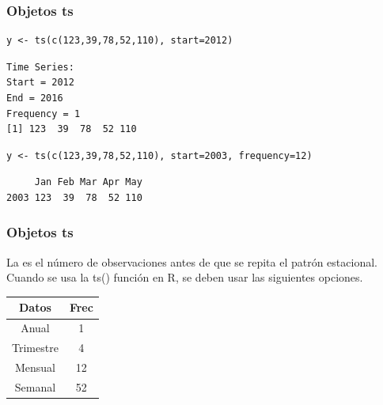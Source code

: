 \documentclass[10pt]{beamer}
\begin{document}




\begin{frame}[fragile]
\frametitle{Objetos ts}


\lstset{language=r,label= ,caption= ,captionpos=b,numbers=none}
\begin{lstlisting}
y <- ts(c(123,39,78,52,110), start=2012)
\end{lstlisting}

\pause

\begin{verbatim}
Time Series:
Start = 2012 
End = 2016 
Frequency = 1 
[1] 123  39  78  52 110
\end{verbatim}

\pause


\lstset{language=r,label= ,caption= ,captionpos=b,numbers=none}
\begin{lstlisting}
y <- ts(c(123,39,78,52,110), start=2003, frequency=12)
\end{lstlisting}

\pause

\begin{verbatim}
     Jan Feb Mar Apr May
2003 123  39  78  52 110
\end{verbatim}



\end{frame}








\begin{frame}[fragile]
\frametitle{Objetos ts}

La  es el número de observaciones antes de que se repita el patrón estacional. Cuando se usa la ts() función en R, se deben usar las siguientes opciones.

\begin{center}
\begin{tabular}{cc}
\hline 
Datos & Frec \\ 
\hline 
Anual & 1 \\ 
Trimestre & 4 \\ 
Mensual & 12 \\ 
Semanal & 52 \\ 
\hline 
\end{tabular} 

\end{center}

\end{frame}
\end{document}
